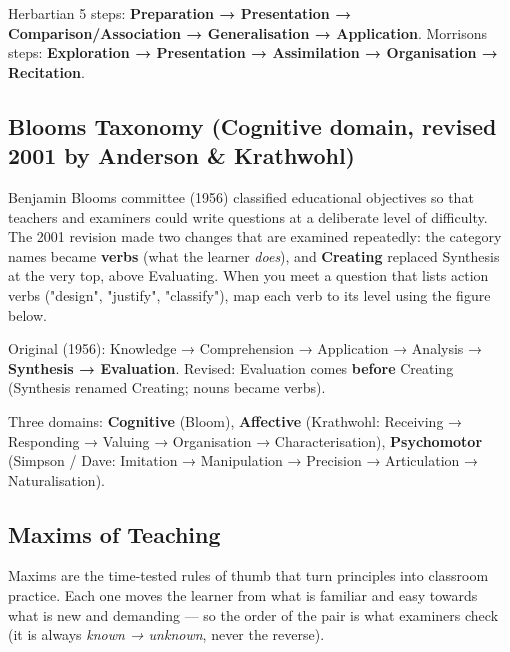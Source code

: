\endgroup

Herbartian 5 steps: \textbf{Preparation → Presentation → Comparison/Association → Generalisation → Application}.
Morrison\textquotesingle s steps: \textbf{Exploration → Presentation → Assimilation → Organisation → Recitation}.

\needspace{125pt}

\hypertarget{p1-01--blooms-taxonomy-cognitive-domain-revised-2001-by-anderson--krathwohl}{%
\subsection{Bloom\textquotesingle s Taxonomy (Cognitive domain, revised 2001 by Anderson \& Krathwohl)}\label{p1-01--blooms-taxonomy-cognitive-domain-revised-2001-by-anderson--krathwohl}}

Benjamin Bloom\textquotesingle s committee (1956) classified educational objectives so that teachers and examiners could
write questions at a deliberate level of difficulty. The 2001 revision made two changes that are examined
repeatedly: the category names became \textbf{verbs} (what the learner \emph{does}), and \textbf{Creating} replaced
Synthesis at the very top, above Evaluating. When you meet a question that lists action verbs ("design",
"justify", "classify"), map each verb to its level using the figure below.



Original (1956): Knowledge → Comprehension → Application → Analysis → \textbf{Synthesis → Evaluation}.
Revised: Evaluation comes \textbf{before} Creating (Synthesis renamed Creating; nouns became verbs).

Three domains: \textbf{Cognitive} (Bloom), \textbf{Affective} (Krathwohl: Receiving → Responding → Valuing → Organisation → Characterisation),
\textbf{Psychomotor} (Simpson / Dave: Imitation → Manipulation → Precision → Articulation → Naturalisation).

\needspace{125pt}

\hypertarget{p1-01--maxims-of-teaching}{%
\subsection{Maxims of Teaching}\label{p1-01--maxims-of-teaching}}

Maxims are the time-tested rules of thumb that turn principles into classroom practice. Each one moves the
learner from what is familiar and easy towards what is new and demanding --- so the order of the pair is
what examiners check (it is always \emph{known → unknown}, never the reverse).

